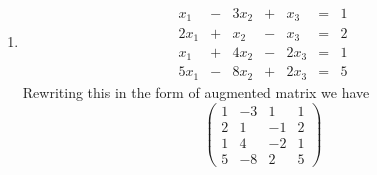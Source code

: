 \documentclass[8pt]{article} %
\newcommand{\myexplain}[3]{#1\xrightarrow{\text{#2}}#3}
\newcommand{\myexplainf}[4]{#1\xrightarrow{\begin{subarray}{c}\text{#2}\\\text{#3}\end{subarray}}#4}
\begin{document}
\begin{description}
{\begin{enumerate}[label=(\alph*)]
{\[		{\textcircled{2}$+$\textcircled{1}}{\textcircled{3}$+2*$\textcircled{1}}
		{\left(\begin{array}{rrrr|r}1&2&-3&1&1\\0&1&1&0&7\\0&0&1&1&3\end{array}\right)}
	\]
	Accidentally, this brings system to row echelon form. However, it has free variables ($x_4$, corresponding to the fourth column
	is free, as there is no pivot in fourth column). Therefore, as problem requires, we bring the augmented matrix to reduced row echelon
	form. First, eliminate everything above the pivot of the third row
	\[\myexplainf
		{\left(\begin{array}{rrrr|r}1&2&-3&1&1\\0&1&1&0&7\\0&0&1&1&3\end{array}\right)}
		{\textcircled{2}$-$\textcircled{3}}{\textcircled{1}$+3*$\textcircled{3}}
		{\left(\begin{array}{rrrr|r}1&2&0&4&10\\0&1&0&-1&4\\0&0&1&1&3\end{array}\right)}
	\]
	Next, eliminate everything above the pivot of the second row
	\[\myexplain
		{\left(\begin{array}{rrrr|r}1&2&0&4&10\\0&1&0&-1&4\\0&0&1&1&3\end{array}\right)}
		{\textcircled{1}$-2*$\textcircled{2}}
		{\left(\begin{array}{rrrr|r}1&0&0&6&2\\0&1&0&-1&4\\0&0&1&1&3\end{array}\right)}
	\]
	From this, we see that all the solutions can be parametrized as
	\[x_1=2-6t,\;x_2=4+t,\;x_3=3-t,\;x_4=t\]
	}
	\setcounter{enumi}{11}\item{
	\[\begin{array}{rrrrrrr}
		x_1 & - {} & 3x_2 & {} + {}     &   x_3 &  = {}& 1\\
		2x_1 & + {} & x_2 & {} - {}     &   x_3 &  = {}& 2\\
		x_1 & + {} & 4x_2 & {} - {}     &   2x_3 &  = {}& 1\\
		5x_1 & - {} & 8x_2 & {} + {}     &  2x_3 &  = {}& 5
	\end{array}\]
	Rewriting this in the form of augmented matrix we have
	\[
	\left(\begin{array}{rrr|r}1&-3&1&1\\2&1&-1&2\\1&4&-2&1\\5&-8&2&5\end{array}\right)
\]}
\end{enumerate}}
\end{description}
\end{document}
